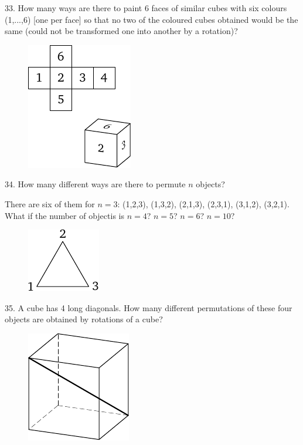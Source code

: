 \begin{problem}{33.}
	How many ways are there to paint 6 faces of similar cubes with six colours (1,...,6) [one per face]
	so that no two of the coloured cubes obtained would be the same (could not be transformed one into another
	by a rotation)? 
	\begin{figure}[h]
	\centering
	 \includegraphics{taskbook-17}
	\end{figure}
\end{problem}

\begin{problem}{34.}
	How many different ways are there to permute $n$ objects?

	There are six of them for $n=3$: (1,2,3), (1,3,2), (2,1,3), (2,3,1), (3,1,2), (3,2,1). What if the number of objectis is $n=4$? $n=5$? $n=6$? $n=10$?
	\begin{figure}[h]
	\centering
	\includegraphics{taskbook-18}
	\end{figure}
\end{problem}

\begin{problem}{35.}
	A cube has 4 long diagonals. How many different permutations of these four objects are obtained by rotations of a cube?
	\begin{figure}[h]
	\centering
	\includegraphics{taskbook-19}
	\end{figure}
\end{problem}

